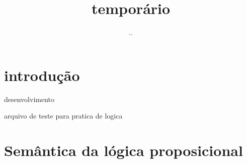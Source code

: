 \documentclass{article}
\title{temporário}
\author{..}
\begin{document}
\maketitle

\section{introdução}

desenvolvimento

arquivo de teste para pratica de logica

\section{Semântica da lógica proposicional}
\end{document}
